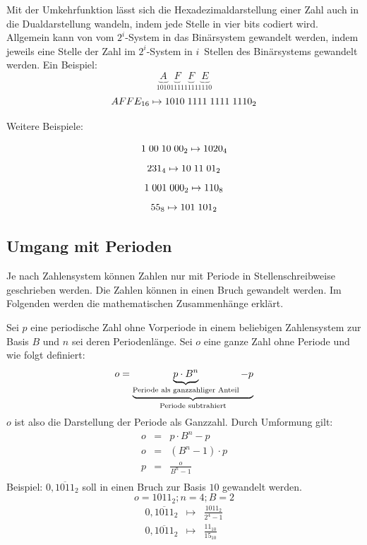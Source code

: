 \documentclass[11pt,a4paper]{scrreprt}
\begin{document}
Mit der Umkehrfunktion lässt sich die Hexadezimaldarstellung einer Zahl auch in die Dualdarstellung wandeln, indem jede Stelle in vier bits codiert wird. Allgemein kann von vom $2^i$-System in das Binärsystem gewandelt werden, indem jeweils eine Stelle der Zahl im $2^i$-System in $i$~Stellen des Binärsystems gewandelt werden. Ein Beispiel:
$$
	\underbrace{A}_{1010} \underbrace{F}_{1111} \underbrace{F}_{1111} \underbrace{E}_{1110}
$$
$$
	AFFE_{16} \mapsto 1010\hspace{1mm}1111\hspace{1mm}1111\hspace{1mm}1110_2
$$

\begin{center}
Weitere Beispiele:
\end{center}
$$ 1\hspace{1mm}00\hspace{1mm}10\hspace{1mm}00_2 \mapsto 1020_4 $$
$$ 231_4 \mapsto 10\hspace{1mm}11\hspace{1mm}01_2 $$
$$ 1\hspace{1mm}001\hspace{1mm}000_2 \mapsto 110_8 $$
$$ 55_8 \mapsto 101\hspace{1mm}101_2 $$

\subsection{Umgang mit Perioden}
Je nach Zahlensystem können Zahlen nur mit Periode in Stellenschreibweise geschrieben werden. Die Zahlen können in einen Bruch gewandelt werden. Im Folgenden werden die mathematischen Zusammenhänge erklärt.

Sei $p$ eine periodische Zahl ohne Vorperiode in einem beliebigen Zahlensystem zur Basis $B$ und $n$ sei deren Periodenlänge. Sei $o$ eine ganze Zahl ohne Periode und wie folgt definiert:
$$
	o = \underbrace{\underbrace{p \cdot B^n}_\textnormal{Periode als ganzzahliger Anteil} - p}_\textnormal{Periode subtrahiert}
$$
$o$ ist also die Darstellung der Periode als Ganzzahl. Durch Umformung gilt:
\begin{eqnarray*}
	o & = & p \cdot B^n - p \\
	o & = & (B^n - 1) \cdot p \\
	p & = & \frac{o}{B^n - 1}\\	
\end{eqnarray*}
Beispiel: $0,\overline{1011}_2$ soll in einen Bruch zur Basis $10$ gewandelt werden.
$$ o = 1011_2; n = 4; B = 2 $$
\begin{eqnarray*}
	0,\overline{1011}_2 & \mapsto & \frac{1011_2}{2^4 - 1} \\
	0,\overline{1011}_2 & \mapsto & \frac{11_{10}}{15_{10}}
\end{eqnarray*}
\end{document}

